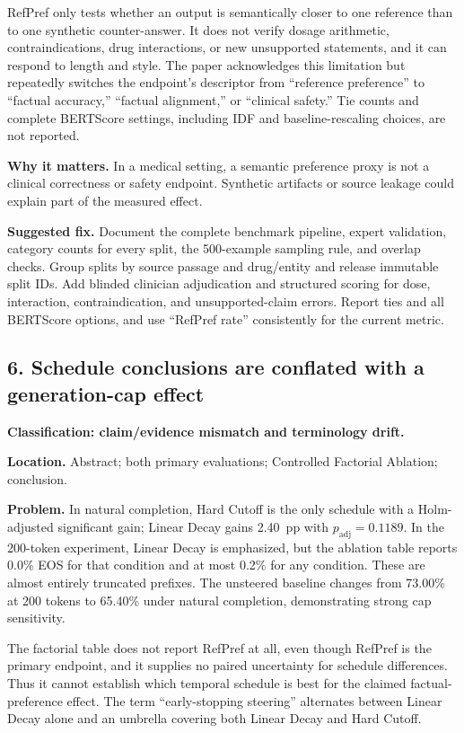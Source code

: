 \documentclass[11pt]{article}
\begin{document}
RefPref only tests whether an output is semantically closer to one reference than to one synthetic counter-answer.  It does not verify dosage arithmetic, contraindications, drug interactions, or new unsupported statements, and it can respond to length and style.  The paper acknowledges this limitation but repeatedly switches the endpoint's descriptor from ``reference preference'' to ``factual accuracy,'' ``factual alignment,'' or ``clinical safety.''  Tie counts and complete BERTScore settings, including IDF and baseline-rescaling choices, are not reported.

\textbf{Why it matters.} In a medical setting, a semantic preference proxy is not a clinical correctness or safety endpoint.  Synthetic artifacts or source leakage could explain part of the measured effect.

\textbf{Suggested fix.} Document the complete benchmark pipeline, expert validation, category counts for every split, the 500-example sampling rule, and overlap checks.  Group splits by source passage and drug/entity and release immutable split IDs.  Add blinded clinician adjudication and structured scoring for dose, interaction, contraindication, and unsupported-claim errors.  Report ties and all BERTScore options, and use ``RefPref rate'' consistently for the current metric.

\subsection*{6. Schedule conclusions are conflated with a generation-cap effect}

\textbf{Classification: claim/evidence mismatch and terminology drift.}

\textbf{Location.} Abstract; both primary evaluations; Controlled Factorial Ablation; conclusion.

\textbf{Problem.} In natural completion, Hard Cutoff is the only schedule with a Holm-adjusted significant gain; Linear Decay gains 2.40~pp with $p_{\text{adj}}=0.1189$.  In the 200-token experiment, Linear Decay is emphasized, but the ablation table reports 0.0\% EOS for that condition and at most 0.2\% for any condition.  These are almost entirely truncated prefixes.  The unsteered baseline changes from 73.00\% at 200 tokens to 65.40\% under natural completion, demonstrating strong cap sensitivity.

The factorial table does not report RefPref at all, even though RefPref is the primary endpoint, and it supplies no paired uncertainty for schedule differences.  Thus it cannot establish which temporal schedule is best for the claimed factual-preference effect.  The term ``early-stopping steering'' alternates between Linear Decay alone and an umbrella covering both Linear Decay and Hard Cutoff.
\end{document}
